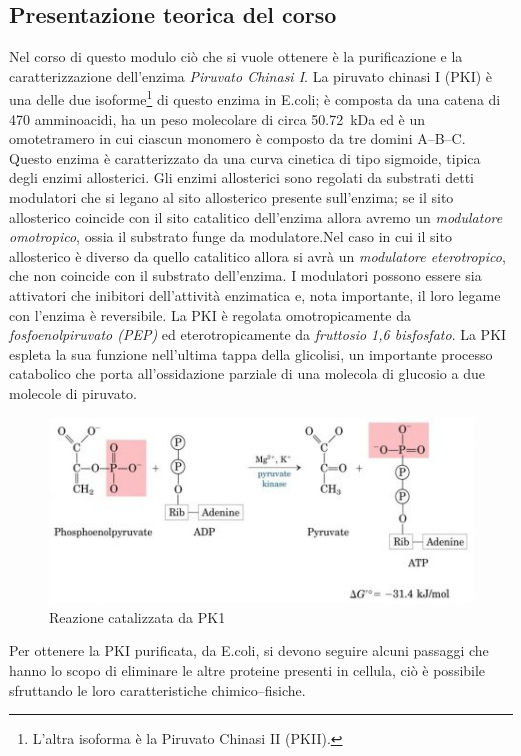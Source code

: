 \documentclass[twocolumn,a4paper,10pt]{my_report}
\begin{document}
{\subsection{Presentazione teorica del corso}
Nel corso di questo modulo ciò che si vuole ottenere è la purificazione e la caratterizzazione dell'enzima \emph{Piruvato Chinasi I}. La piruvato chinasi I (PKI) è una delle due isoforme\footnote{L'altra isoforma è la Piruvato Chinasi II (PKII).} di questo enzima in E.coli; è composta da una catena di 470 amminoacidi, ha un peso molecolare di circa \SI{50,72}{\kilo\dalton} ed è un omotetramero in cui ciascun monomero è composto da tre domini A--B--C. Questo enzima è caratterizzato da una curva cinetica di tipo sigmoide, tipica degli enzimi allosterici. Gli enzimi allosterici sono regolati da substrati detti modulatori che si legano al sito allosterico presente sull'enzima; se il sito allosterico coincide con il sito catalitico dell'enzima allora avremo un \emph{modulatore omotropico}, ossia il substrato funge da modulatore.Nel caso in cui il sito allosterico è diverso da quello catalitico allora si avrà un \emph{modulatore eterotropico}, che non coincide con il substrato dell'enzima. I modulatori possono essere sia attivatori che inibitori dell'attività enzimatica e, nota importante, il loro legame con l'enzima è reversibile.
La PKI è regolata omotropicamente da \emph{fosfoenolpiruvato (PEP)} ed eterotropicamente da \emph{fruttosio 1,6 bisfosfato}.
La PKI espleta la sua funzione nell'ultima tappa della glicolisi, un importante processo catabolico che porta all'ossidazione parziale di una molecola di glucosio a due molecole di piruvato.
\begin{figure}[htbp]
\centering
\includegraphics[width=0.8\linewidth]{5.jpg}
\caption{Reazione catalizzata da PK1}
\label{fig:Reazione pk1}
\end{figure}

Per ottenere la PKI purificata, da E.coli, si devono seguire alcuni passaggi che hanno lo scopo di eliminare le altre proteine presenti in cellula, ciò è possibile sfruttando le loro caratteristiche chimico--fisiche.

}
\end{document}
